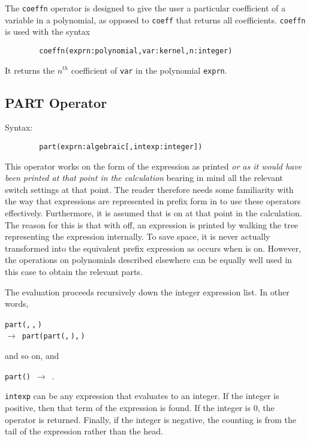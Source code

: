 The \texttt{coeffn} operator is designed to give the user a particular
coefficient of a variable in a polynomial, as opposed to \texttt{coeff} that
returns all coefficients. \texttt{coeffn} is used with the syntax
\begin{verbatim}
        coeffn(exprn:polynomial,var:kernel,n:integer)
\end{verbatim}
It returns the $n^{th}$ coefficient of \texttt{var} in the polynomial
\texttt{exprn}.

\subsection{PART Operator}
\hypertarget{operator:PART}{}
Syntax:
\begin{verbatim}
        part(exprn:algebraic[,intexp:integer])
\end{verbatim}

This operator works on the form of the expression as printed \emph{or as it
would have been printed at that point in the calculation} bearing in mind
all the relevant switch settings at that point.  The reader therefore
needs some familiarity with the way that expressions are represented in
prefix form in {\REDUCE} to use these operators effectively.  Furthermore,
it is assumed that  is on at that point in the calculation.
The reason for this is that with  off, an expression is printed
by walking the tree representing the expression internally.  To save
space, it is never actually transformed into the equivalent prefix
expression as occurs when  is on.  However, the operations on
polynomials described elsewhere can be equally well used in this case to
obtain the relevant parts.

The evaluation proceeds recursively down the integer expression list. In
other words,
\begin{syntaxtable}
  \texttt{part(}\texttt{,}\,\texttt{,}\,\texttt{)} \\
  \qquad $\longrightarrow$\ \texttt{part(part(}\texttt{,}\,\texttt{),}\,\texttt{)}
\end{syntaxtable}
 and so on, and
\begin{syntax}
  \texttt{part(}\texttt{)}\ $\longrightarrow$\ .
\end{syntax}
\texttt{intexp} can be any expression that evaluates to an integer.  If the
integer is positive, then that term of the expression is found.  If the
integer is 0, the operator is returned.  Finally, if the integer is
negative, the counting is from the tail of the expression rather than the
head.

